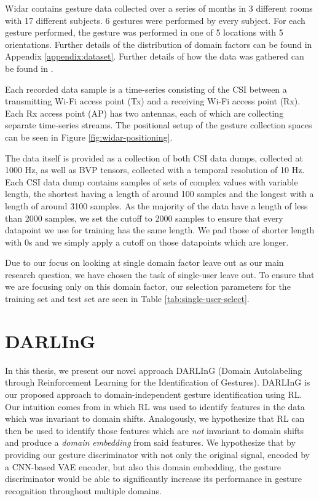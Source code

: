 Widar\cite{zheng2019zero} contains gesture data collected over a series of months in 3 different rooms with 17 different subjects.
6 gestures were performed by every subject.
For each gesture performed, the gesture was performed in one of 5 locations with 5 orientations.
Further details of the distribution of domain factors can be found in Appendix \ref{appendix:dataset}.
Further details of how the data was gathered can be found in \cite{zheng2019zero}.

Each recorded data sample is a time-series consisting of the CSI between a transmitting Wi-Fi access point (Tx) and a receiving Wi-Fi access point (Rx).
Each Rx access point (AP) has two antennas, each of which are collecting separate time-series streams.
The positional setup of the gesture collection spaces can be seen in Figure \ref{fig:widar-positioning}.

The data itself is provided as a collection of both CSI data dumps, collected at 1000 Hz, as well as BVP tensors, collected with a temporal resolution of 10 Hz.
Each CSI data dump contains samples of sets of complex values with variable length, the shortest having a length of around 100 samples and the longest with a length of around 3100 samples. 
As the majority of the data have a length of less than 2000 samples, we set the cutoff to 2000 samples to ensure that every datapoint we use for training has the same length. 
We pad those of shorter length with 0s and we simply apply a cutoff on those datapoints which are longer.

Due to our focus on looking at single domain factor leave out as our main research question, we have chosen the task of single-user leave out.
To ensure that we are focusing only on this domain factor, our selection parameters for the training set and test set are seen in Table \ref{tab:single-user-select}.

\section{DARLInG}

In this thesis, we present our novel approach DARLInG (Domain Autolabeling through Reinforcement Learning for the Identification of Gestures).
DARLInG is our proposed approach to domain-independent gesture identification using RL.
Our intuition comes from \cite{zhang2021adversarial} in which RL was used to identify features in the data which was invariant to domain shifts.
Analogously, we hypothesize that RL can then be used to identify those features which are \textit{not} invariant to domain shifts and produce a \textit{domain embedding} from said features.
We hypothesize that by providing our gesture discriminator with not only the original signal, encoded by a CNN-based VAE encoder, but also this domain embedding, the gesture discriminator would be able to significantly increase its performance in gesture recognition throughout multiple domains.

